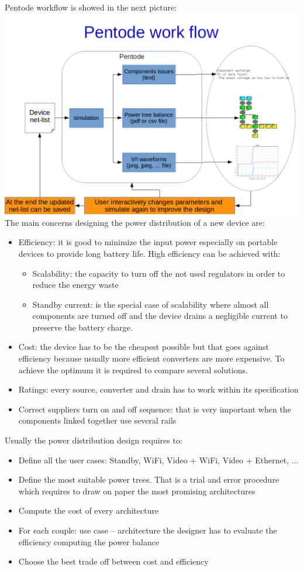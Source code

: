 \documentclass[12pt,a4paper]{book}
\begin{document}
Pentode workflow is showed in the next picture:\\
\includegraphics[width=\textwidth]{PentodeWorkFlow.png}\\
The main concerns designing the power distribution of a new device are:\\
\begin{itemize}
\item Efficiency: it is good to minimize the input power especially on portable devices to provide long battery life. High efficiency can be achieved with:
\begin{itemize}
\item Scalability: the capacity to turn off the not used regulators in order to reduce the energy waste
\item Standby current: is the special case of scalability where almost all components are turned off and the device drains a negligible current to preserve the battery charge.
\end{itemize}
\item Cost: the device has to be the cheapest possible but that goes against efficiency because usually more efficient converters are more expensive. To achieve the optimum it is required to compare several solutions.
\item Ratings: every source, converter and drain has to work within its specification
\item Correct suppliers turn on and off sequence: that is very important when the components linked together use several rails 
\end{itemize}
Usually the power distribution design requires to:
\begin{itemize}
\item Define all the user cases: Standby, WiFi, Video + WiFi, Video + Ethernet, ...
\item Define the most suitable power trees. That is a trial and error procedure which requires to draw on paper the most promising architectures 
\item Compute the cost of every architecture 
\item For each couple: use case – architecture the designer has to evaluate the efficiency computing the power balance  
\item Choose the best trade off between cost and efficiency 
\end{itemize}
\end{document}
